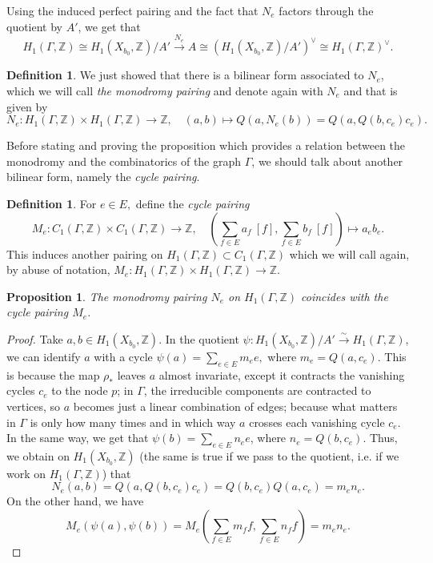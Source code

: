 \documentclass[a4paper,12 pt,titlepage,twoside]{book}
\newcommand{\numberset}{\mathbb}
\newcommand{\Z}{\numberset{Z}}
\theoremstyle{plain}
\theoremstyle{theorem}
\newtheorem{prop}[thm]{Proposition}
\theoremstyle{definition}
\newtheorem{defn}[thm]{Definition}
\theoremstyle{remark}
\begin{document}
	Using the induced perfect pairing and the fact that $N_e$ factors through the quotient by $A'$, we get that $$H_1(\Gamma,\Z) \cong H_1(X_{b_0},\Z)/A' \stackrel{N_e}{\longrightarrow} A \cong (H_1(X_{b_0},\Z)/A')^\vee \cong H_1(\Gamma,\Z)^\vee.$$
	\begin{defn}
		We just showed that there is a bilinear form associated to $N_e$, which we will call \emph{the monodromy pairing} and denote again with $N_e$ and that is given by $$N_e \colon H_1(\Gamma, \Z) \times H_1(\Gamma,\Z) \rightarrow \Z, \quad (a,b) \mapsto Q(a, N_e(b)) = Q(a, Q(b,c_e)c_e).$$
	\end{defn} 
	Before stating and proving the proposition which provides a relation between the monodromy and the combinatorics of the graph $\Gamma$, we should talk about another bilinear form, namely the \emph{cycle pairing}.
	\begin{defn}\label{def: bilnear form Me}
		For $e \in E,$ define the \emph{cycle pairing} $$M_e \colon C_1(\Gamma,\Z) \times C_1(\Gamma,\Z) \rightarrow \Z, \quad \left(\sum_{f \in E} a_f \ [f], \sum_{f \in E} b_f \ [f]\right) \mapsto a_e b_e.$$
		This induces another pairing on $H_1(\Gamma,\Z) \subset C_1(\Gamma,\Z)$ which we will call again, by abuse of notation, $M_e \colon H_1(\Gamma,\Z) \times H_1(\Gamma,\Z) \rightarrow  \Z.$
	\end{defn}
	\begin{prop}\label{prop: Ne = Me}
		The monodromy pairing $N_e$ on $H_1(\Gamma,\Z)$ coincides with the cycle pairing $M_e$.
	\end{prop}
	\begin{proof}
		Take $a,b \in H_1(X_{b_0},\Z)$. In the quotient $\psi \colon H_1(X_{b_0},\Z)/A' \stackrel{\sim}{\longrightarrow} H_1(\Gamma,\Z)$, we can identify $a$ with a cycle $\psi(a) = \sum_{e \in E} m_e e,$ where $m_e = Q(a, c_e).$ This is because the map $\rho_*$ leaves $a$ almost invariate, except it contracts the vanishing cycles $c_e$ to the node $p$; in $\Gamma$, the irreducible components are contracted to vertices, so $a$ becomes just a linear combination of edges; because what matters in $\Gamma$ is only how many times and in which way $a$ crosses each vanishing cycle $c_e.$ In the same way, we get that $\psi(b) = \sum_{e \in E} n_e e$, where $n_e= Q(b,c_e)$. Thus, we obtain on $H_1(X_{b_0},\Z)$ (the same is true if we pass to the quotient, i.e. if we work on $H_1(\Gamma,\Z)$) that $$N_e(a,b) = Q(a, Q(b, c_e) c_e ) = Q(b,c_e) Q(a,c_e)= m_e n_e.$$ On the other hand, we have $$M_e(\psi(a),\psi(b)) = M_e \left(\sum_{f \in E} m_f f, \sum_{f \in E} n_f f\right) = m_e n_e .$$
	\end{proof}
\end{document}
